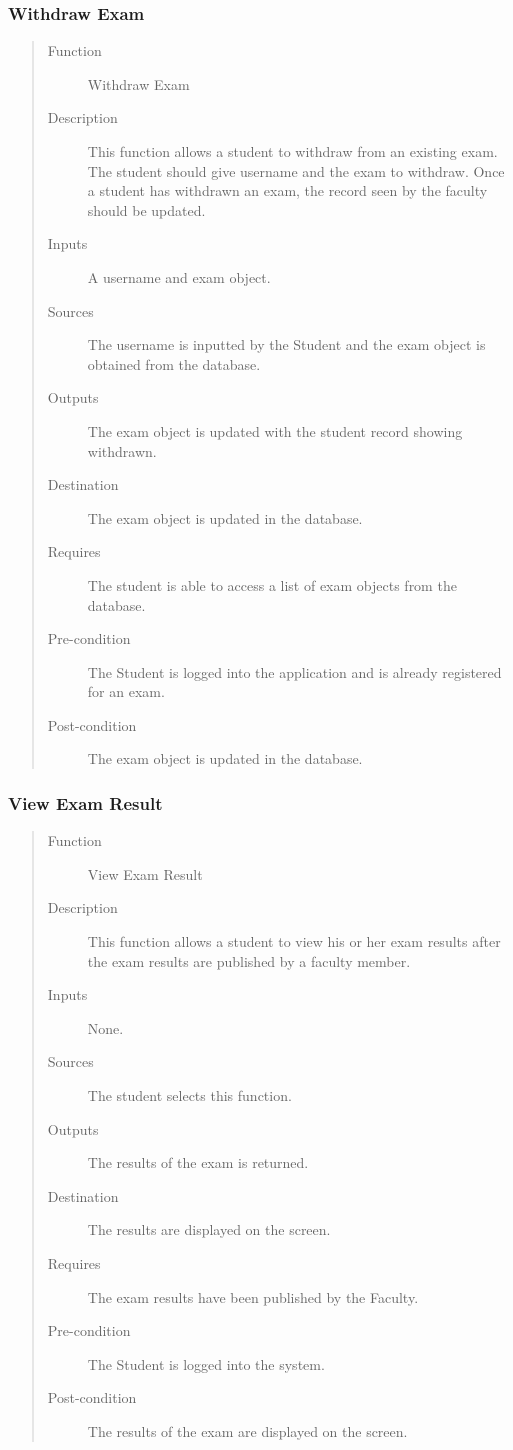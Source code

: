 \subsubsection{Withdraw Exam}
\begin{quote} %
\begin{description}
\item[Function]
   Withdraw Exam
\item[Description]
   This function allows a student to withdraw from an existing exam. The student
   should give username and the exam to withdraw. Once a student has withdrawn
   an exam, the record seen by the faculty should be updated.
\item[Inputs]
   A username and exam object.
\item[Sources]
   The username is inputted by the Student and the exam object is obtained from
   the database.
\item[Outputs]
   The exam object is updated with the student record showing withdrawn.
\item[Destination]
   The exam object is updated in the database.
\item[Requires]
   The student is able to access a list of exam objects from the database.
\item[Pre-condition]
   The Student is logged into the application and is already registered for an
   exam.
\item[Post-condition]
   The exam object is updated in the database.
\end{description}
\end{quote} %

\subsubsection{View Exam Result}
\begin{quote} %
\begin{description}
\item[Function]
   View Exam Result
\item[Description]
   This function allows a student to view his or her exam results after the exam
   results are published by a faculty member.
\item[Inputs]
   None.
\item[Sources]
   The student selects this function.
\item[Outputs]
   The results of the exam is returned.
\item[Destination]
   The results are displayed on the screen.
\item[Requires]
   The exam results have been published by the Faculty.
\item[Pre-condition]
   The Student is logged into the system.
\item[Post-condition]
   The results of the exam are displayed on the screen.
\end{description}
\end{quote} %
